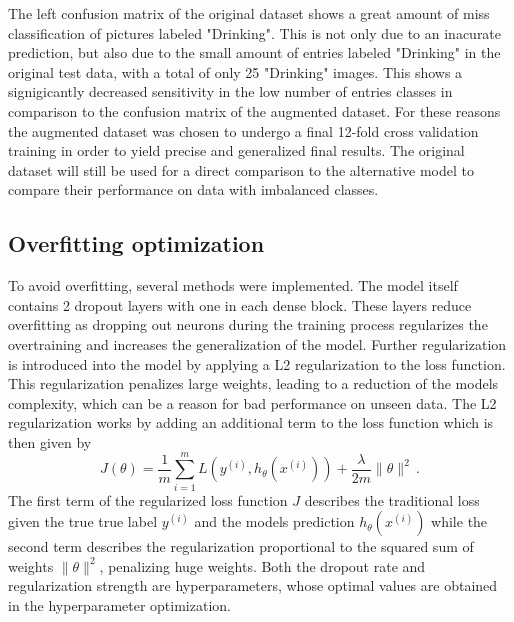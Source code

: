 \noindent
The left confusion matrix of the original dataset shows a great amount of miss classification of pictures labeled "Drinking". This is not only due to an inacurate prediction, but also due to the small amount of entries labeled "Drinking" in the original test data, with a total of only 25 "Drinking" images. This shows a signigicantly decreased sensitivity in the low number of entries classes in comparison to the confusion matrix of the augmented dataset. For these reasons the augmented dataset was chosen to undergo a final 12-fold cross validation training in order to yield precise and generalized final results. The original dataset will still be used for a direct comparison to the alternative model to compare their performance on data with imbalanced classes.
\subsection{Overfitting optimization}
To avoid overfitting, several methods were implemented. The model itself contains 2 dropout layers with one in each dense block. These layers reduce overfitting as dropping out neurons during the training process regularizes the overtraining and increases the generalization of the model. Further regularization is introduced into the model by applying a L2 regularization to the loss function. This regularization penalizes large weights, leading to a reduction of the models complexity, which can be a reason for bad performance on unseen data.
The L2 regularization works by adding an additional term to the loss function which is then given by $$J(\theta) = \frac{1}{m} \sum_{i=1}^{m} L(y^{(i)}, h_\theta(x^{(i)})) + \frac{\lambda}{2m} \|\theta\|^2 \, .$$ The first term of the regularized loss function $J$ describes the traditional loss given the true true label $y^{\left(i\right)}$ and the models prediction $h_\theta\left(x^{\left(i\right)}\right)$ while the second term describes the regularization proportional to the squared sum of weights $\|\theta\|^2$, penalizing huge weights. Both the dropout rate and regularization strength are hyperparameters, whose optimal values are obtained in the hyperparameter optimization.
